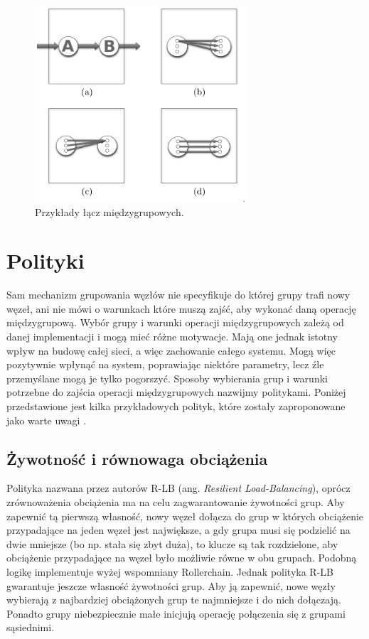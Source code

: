 \documentclass[12pt, twoside, openany]{report}
\begin{document}
\begin{figure}[H]
\centering
\includegraphics[width=0.7\textwidth,height=\textheight,keepaspectratio]{links.png}
\caption{Przykłady łącz międzygrupowych.}
\label{fig:links}
\end{figure}


\section{Polityki}

Sam mechanizm grupowania węzłów nie specyfikuje do której grupy trafi nowy węzeł, ani nie mówi o warunkach które muszą zajść, aby wykonać daną operację międzygrupową. Wybór grupy i warunki operacji międzygrupowych zależą od danej implementacji i mogą mieć różne motywacje. Mają one jednak istotny wpływ na budowę całej sieci, a więc zachowanie całego systemu. Mogą więc pozytywnie wpłynąć na system, poprawiając niektóre parametry, lecz źle przemyślane mogą je tylko pogorszyć. Sposoby wybierania grup i warunki potrzebne do zajścia operacji międzygrupowych nazwijmy politykami. Poniżej przedstawione jest kilka przykładowych polityk, które zostały zaproponowane jako warte uwagi \cite{bib:paiva}.

\subsection{Żywotność i równowaga obciążenia}
Polityka nazwana przez autorów R-LB (ang. \textit{Resilient Load-Balancing}), oprócz zrównoważenia obciążenia ma na celu zagwarantowanie żywotności grup. Aby zapewnić tą pierwszą własność, nowy węzeł dołącza do grup w których obciążenie przypadające na jeden węzeł jest największe, a gdy grupa musi się podzielić na dwie mniejsze (bo np. stała się zbyt duża), to klucze są tak rozdzielone, aby obciążenie przypadające na węzeł było możliwie równe w obu grupach. Podobną logikę implementuje wyżej wspomniany Rollerchain. Jednak polityka R-LB gwarantuje jeszcze własność żywotności grup. Aby ją zapewnić, nowe węzły wybierają z najbardziej obciążonych grup te najmniejsze i do nich dołączają. Ponadto grupy niebezpiecznie małe inicjują operację połączenia się z grupami sąsiednimi.
\end{document}
